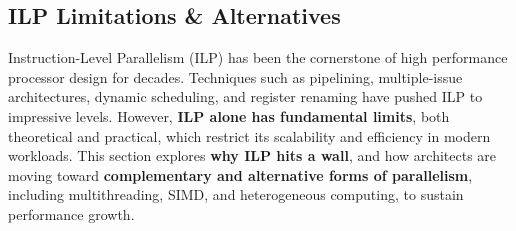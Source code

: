 \subsection{ILP Limitations \& Alternatives}

Instruction-Level Parallelism (ILP) has been the cornerstone of high performance processor design for decades. Techniques such as pipelining, multiple-issue architectures, dynamic scheduling, and register renaming have pushed ILP to impressive levels. However, \textbf{ILP alone has fundamental limits}, both theoretical and practical, which restrict its scalability and efficiency in modern workloads. This section explores \textbf{why ILP hits a wall}, and how architects are moving toward \textbf{complementary and alternative forms of parallelism}, including multithreading, SIMD, and heterogeneous computing, to sustain performance growth.

